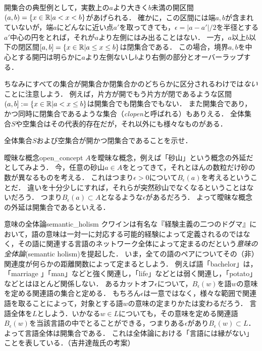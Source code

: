 \documentclass[11pt,a4paper, dvipdfmx]{jsarticle}
\begin{document}
開集合の典型例として，実数上の$a$より大きく$b$未満の開区間$(a, b) = \{x \in \mathbb{R}| a < x < b\}$があげられる．
確かに，この区間には端$a, b$が含まれていないが，端$a$にどんなに近い点$a'$を取ってきても，$\epsilon=|a-a'|/2$を半径とする$a'$中心の円をとれば，それが$a$より左側にはみ出ることはない．
一方，$a$以上$b$以下の閉区間$[a, b] = \{x \in \mathbb{R}| a \leq  x \leq  b\}$は閉集合である．
この場合，境界$a, b$を中心とする開円は明らかに$a$より左側ないし$b$より右側の部分とオーバーラップする．

ちなみにすべての集合が開集合か閉集合かのどちらかに区分されるわけでは\emph{ない}ことに注意しよう．
例えば，片方が開でもう片方が閉であるような区間$(a, b] := \{ x \in \mathbb{R}| a < x \leq b \}$は開集合でも閉集合でもない．
また開集合であり，かつ同時に閉集合であるような集合（\emph{clopen}と呼ばれる）もありえる．
全体集合$S$や空集合はその代表的存在だが，それ以外にも様々なものがある．

\begin{renshu}{}{}
  全体集合$S$および空集合が開かつ閉集合であることを示せ．
\end{renshu}


\begin{rei}{曖昧な概念}{open_concept}
  $A$を曖昧な概念，例えば「砂山」という概念の外延だとしてみよう．
  今，任意の砂山$a \in A$をとってきて，それとほんの数粒だけ砂の数が異なるものを考える．
  これはつまり$\epsilon > 0$について$B_\epsilon(a)$を考えるということだ．
  違いを十分少しにすれば，それらが突然砂山でなくなるということはないだろう．
  つまり$B_\epsilon(a) \subset A$となるような$\epsilon$があるだろう．
  よって曖昧な概念の外延は開集合であるといえる．
\end{rei}


\begin{rei}{意味の全体論}{semantic_holism}
クワインは有名な『経験主義の二つのドグマ』において，語の意味は一対一に対応する可能的経験によって定義されるのではなく，その語に関連する言語のネットワーク全体によって定まるのだという\emph{意味の全体論}(semantic holism)を提起した．
いま，全ての語のペアについてその（非）関連度が何らかの距離関数によって定まるとしよう．
例えば語「bachelor」は，「marriage 」「man」などと強く関連し，「life」などとは弱く関連し，「potato」などとはほとんど関係しない．
あるカットオフ$\epsilon$について，$B_\epsilon(w)$を語$w$の意味を定める関連語の集合と定める．
もちろん$\epsilon$は一意ではなく，様々な範囲で関連語を取ることによって，対象とする語$w$の意味の定まりかたは変わるだろう．
言語全体を$L$としよう．いかなる$w \in L$についても，その意味を定める関連語$B_\epsilon(w)$を当該言語の中でとることができる，つまりある$\epsilon$があり$B_\epsilon(w) \subset L$．
よって言語全体は開集合である．
これは全体論における「言語には縁がない」ことを表している．（吉井達哉氏の考案）
\end{rei}
\end{document}
